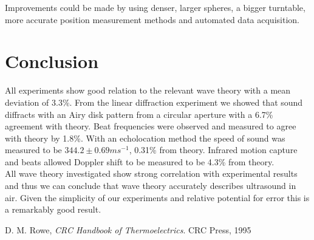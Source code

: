 \documentclass[a4paper,10pt,journal]{IEEEtran}
\begin{document}
Improvements could be made by using denser, larger spheres, a bigger turntable, more accurate position measurement methods and automated data acquisition.

\section{Conclusion}

All experiments show good relation to the relevant wave theory with a mean deviation of 3.3\%. From the linear diffraction experiment we showed that sound diffracts with an Airy disk pattern from a circular aperture with a 6.7\% agreement with theory. Beat frequencies were observed and measured to agree with theory by 1.8\%. With an echolocation method the speed of sound was measured to be $344.2 \pm 0.69 ms^{-1}$, 0.31\% from theory. Infrared motion capture and beats allowed Doppler shift to be measured to be 4.3\% from theory.\\
All wave theory investigated show strong correlation with experimental results and thus we can conclude that wave theory accurately describes ultrasound in air. Given the simplicity of our experiments and relative potential for error this is a remarkably good result.


\begin{thebibliography}{9}
D. M. Rowe, \emph{CRC Handbook of Thermoelectrics}. CRC Press, 1995


\end{thebibliography}
\end{document}
